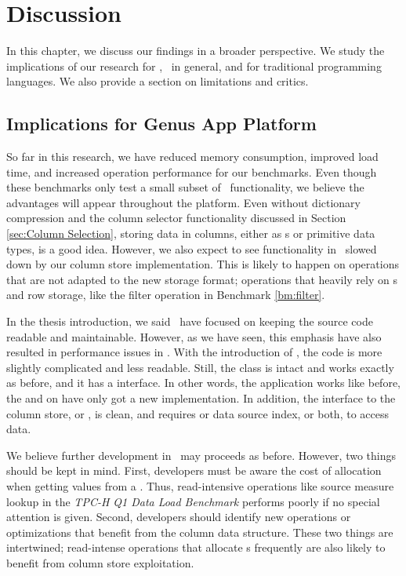 \chapter{Discussion}
\label{chap:Discussion}
In this chapter, we discuss our findings in a broader perspective. We study the implications of our research for \gap, \mde~in general, and for traditional programming languages. We also provide a section on limitations and critics.

\clearpage

\section{Implications for Genus App Platform}
\label{sec:Implications for Genus App Platform}
So far in this research, we have reduced memory consumption, improved load time, and increased operation performance for our benchmarks. Even though these benchmarks only test a small subset of \gap~functionality, we believe the advantages will appear throughout the platform. Even without dictionary compression and the column selector functionality discussed in Section \ref{sec:Column Selection}, storing data in columns, either as s or primitive data types, is a good idea. However, we also expect to see functionality in \gap~slowed down by our column store implementation. This is likely to happen on operations that are not adapted to the new storage format; operations that heavily rely on s and row storage, like the filter operation in Benchmark \ref{bm:filter}.

In the thesis introduction, we said \genus~have focused on keeping the source code readable and maintainable. However, as we have seen, this emphasis have also resulted in performance issues in \gap. With the introduction of , the code is more slightly complicated and less readable. Still, the  class is intact and works exactly as before, and it has a  interface. In other words, the application works like before, the  and  on  have only got a new implementation. In addition, the interface to the column store, or , is clean, and requires  or data source index, or both, to access data.

We believe further development in \gap~may proceeds as before. However, two things should be kept in mind. First, developers must be aware the cost of  allocation when getting values from a . Thus, read-intensive operations like source measure lookup in the \textit{TPC-H Q1 Data Load Benchmark} performs poorly if no special attention is given. Second, developers should identify new operations or optimizations that benefit from the column data structure. These two things are intertwined; read-intense operations that allocate s frequently are also likely to benefit from column store exploitation.

